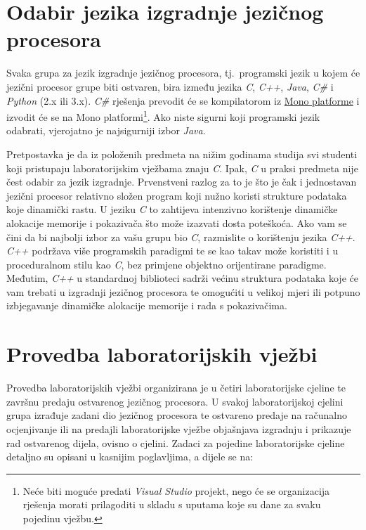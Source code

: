\documentclass[times, 12pt, utf8]{book}
\begin{document}
\section{Odabir jezika izgradnje jezičnog procesora}
Svaka grupa za jezik izgradnje jezičnog procesora, tj.~programski jezik u kojem će jezični procesor grupe biti ostvaren, bira između jezika \emph{C}, \emph{C++}, \emph{Java}, \emph{C\#} i \emph{Python} (2.x ili 3.x).
\emph{C\#} rješenja prevodit će se kompilatorom iz \href{http://www.mono-project.com/What_is_Mono}{Mono platforme} i izvodit će se na Mono platformi\footnote{Neće biti moguće predati \emph{Visual Studio} projekt, nego će se organizacija rješenja morati prilagoditi u skladu s uputama koje su dane za svaku pojedinu vježbu.}.
Ako niste sigurni koji programski jezik odabrati, vjerojatno je najsigurniji izbor \emph{Java}.

Pretpostavka je da iz položenih predmeta na nižim godinama studija svi studenti koji pristupaju laboratorijskim vježbama znaju \emph{C}.
Ipak, \emph{C} u praksi predmeta nije čest odabir za jezik izgradnje.
Prvenstveni razlog za to je što je čak i jednostavan jezični procesor relativno složen program koji nužno koristi strukture podataka koje dinamički rastu.
U jeziku \emph{C} to zahtijeva intenzivno korištenje dinamičke alokacije memorije i pokazivača što može izazvati dosta poteškoća.
Ako vam se čini da bi najbolji izbor za vašu grupu bio \emph{C}, razmislite o korištenju jezika \emph{C++}.
\emph{C++} podržava više programskih paradigmi te se kao takav može koristiti i u proceduralnom stilu kao \emph{C}, bez primjene objektno orijentirane paradigme.
Međutim, \emph{C++} u standardnoj biblioteci sadrži većinu struktura podataka koje će vam trebati u izgradnji jezičnog procesora te omogućiti u velikoj mjeri ili potpuno izbjegavanje dinamičke alokacije memorije i rada s pokazivačima.

\section{Provedba laboratorijskih vježbi}
Provedba laboratorijskih vježbi organizirana je u četiri laboratorijske cjeline te završnu predaju ostvarenog jezičnog procesora.
U svakoj laboratorijskoj cjelini grupa izrađuje zadani dio jezičnog procesora te ostvareno predaje na računalno ocjenjivanje ili na predajli laboratorijske vježbe objašnjava izgradnju i prikazuje rad ostvarenog dijela, ovisno o cjelini.
Zadaci za pojedine laboratorijske cjeline detaljno su opisani u kasnijim poglavljima, a dijele se na:
\end{document}
